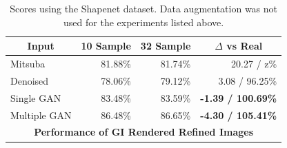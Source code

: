 \documentclass[10pt,twocolumn,letterpaper]{article}
\begin{document}
\begin{table}[]
\centering
\begin{tabular}{|l|r|r|r|}
\hline
\multicolumn{1}{|c|}{\textbf{Input}}
& \multicolumn{1}{c|}{\textbf{10 Sample}}
& \multicolumn{1}{c|}{\textbf{32 Sample}}
& \multicolumn{1}{c|}{\textbf{$\Delta$ vs Real}} \\ \hline
Mitsuba		& 81.88\%	& 81.74\%	& 20.27 / z\% \\
Denoised	& 78.06\%	& 79.12\%	& 3.08 / 96.25\%	\\
Single GAN	& 83.48\%	& 83.59\%	& \textbf{-1.39 / 100.69\%}	\\
Multiple GAN& 86.48\%	& 86.65\% 	& \textbf{-4.30 / 105.41\%}		\\ \hline
\multicolumn{4}{|c|}{\textbf{Performance of GI Rendered Refined Images}}	\\ \hline
\end{tabular}
\caption{Scores using the Shapenet dataset. Data augmentation was not used for the experiments listed above.}
\label{tblallrefined}
\end{table}
\end{document}

